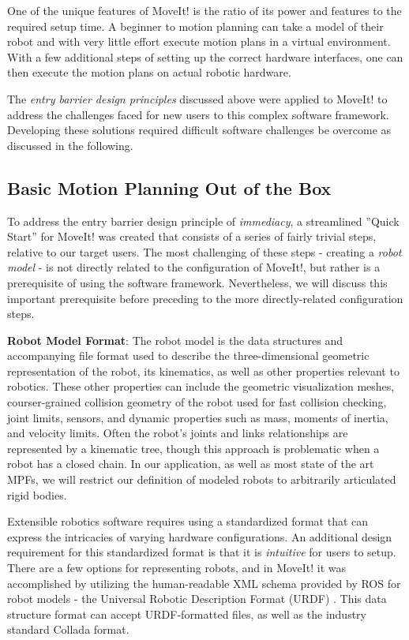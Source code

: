 \documentclass[10pt,journal,compsoc]{joser1}
\begin{document}
{One of the unique features of MoveIt! is the ratio of its power and features to the required setup time. A beginner to motion planning can take a model of their robot and with very little effort execute motion plans in a virtual environment. With a few additional steps of setting up the correct hardware interfaces, one can then execute the motion plans on actual robotic hardware.

The \textit{entry barrier design principles} discussed above were applied to MoveIt! to address the challenges faced for new users to this complex software framework. Developing these solutions required difficult software challenges be overcome as discussed in the following.

\subsection{Basic Motion Planning Out of the Box}

To address the entry barrier design principle of \textit{immediacy}, a streamlined ''Quick Start'' for MoveIt! was created that consists of a series of fairly trivial steps, relative to our target users. The most challenging of these steps - creating a \textit{robot model} - is not directly related to the configuration of MoveIt!, but rather is a prerequisite of using the software framework. Nevertheless, we will discuss this important prerequisite before preceding to the more directly-related configuration steps. 

{\bf Robot Model Format}: The robot model is the data structures and accompanying file format used to describe the three-dimensional geometric representation of the robot, its kinematics, as well as other properties relevant to robotics. These other properties can include the geometric visualization meshes, courser-grained collision geometry of the robot used for fast collision checking, joint limits, sensors, and dynamic properties such as mass, moments of inertia, and velocity limits. Often the robot's joints and links relationships are represented by a kinematic tree, though this approach is problematic when a robot has a closed chain. In our application, as well as most state of the art MPFs, we will restrict our definition of modeled robots to arbitrarily articulated rigid bodies. 

Extensible robotics software requires using a standardized format that can express the intricacies of varying hardware configurations. An additional design requirement for this standardized format is that it is \textit{intuitive} for users to setup. There are a few options for representing robots, and in MoveIt! it was accomplished by utilizing the human-readable XML schema provided by ROS for robot models - the Universal Robotic Description Format (URDF) \cite{urdf}. This data structure format can accept URDF-formatted files, as well as the industry standard Collada \cite{collada} format.

}
\end{document}
